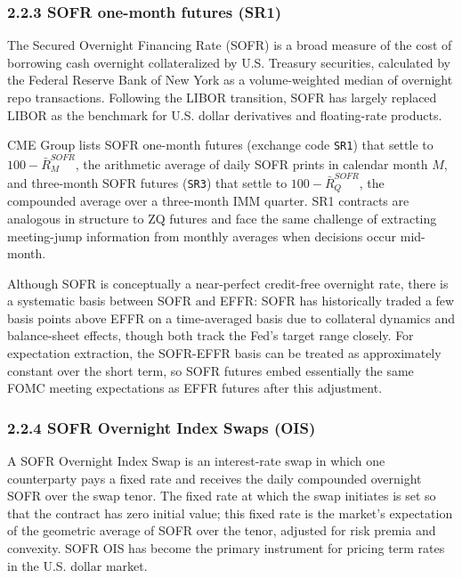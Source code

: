 \subsubsection*{2.2.3 SOFR one-month futures (SR1)}

The Secured Overnight Financing Rate (SOFR) is a broad measure of the cost of borrowing cash overnight collateralized by U.S. Treasury securities, calculated by the Federal Reserve Bank of New York as a volume-weighted median of overnight repo transactions. Following the LIBOR transition, SOFR has largely replaced LIBOR as the benchmark for U.S. dollar derivatives and floating-rate products.

CME Group lists SOFR one-month futures (exchange code \texttt{SR1}) that settle to $100 - \bar{R}^{SOFR}_{M}$, the arithmetic average of daily SOFR prints in calendar month $M$, and three-month SOFR futures (\texttt{SR3}) that settle to $100 - \bar{R}^{SOFR}_{Q}$, the compounded average over a three-month IMM quarter. SR1 contracts are analogous in structure to ZQ futures and face the same challenge of extracting meeting-jump information from monthly averages when decisions occur mid-month.

Although SOFR is conceptually a near-perfect credit-free overnight rate, there is a systematic basis between SOFR and EFFR: SOFR has historically traded a few basis points above EFFR on a time-averaged basis due to collateral dynamics and balance-sheet effects, though both track the Fed's target range closely. For expectation extraction, the SOFR-EFFR basis can be treated as approximately constant over the short term, so SOFR futures embed essentially the same FOMC meeting expectations as EFFR futures after this adjustment.

\subsubsection*{2.2.4 SOFR Overnight Index Swaps (OIS)}

A SOFR Overnight Index Swap is an interest-rate swap in which one counterparty pays a fixed rate and receives the daily compounded overnight SOFR over the swap tenor. The fixed rate at which the swap initiates is set so that the contract has zero initial value; this fixed rate is the market's expectation of the geometric average of SOFR over the tenor, adjusted for risk premia and convexity. SOFR OIS has become the primary instrument for pricing term rates in the U.S. dollar market.

